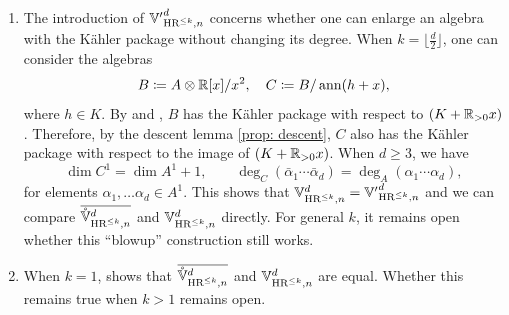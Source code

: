 \begin{remark}
\begin{enumerate}[leftmargin=*]
    \item The introduction of ${\Bbb V'}^d_{\text{HR}^{\leq k},n}$ concerns whether one can enlarge an algebra with the K\"ahler package without changing its degree. When $k=\lfloor\frac{d}{2}\rfloor$, one can consider the algebras
    \[
        B\coloneqq A\otimes \mathbb{R}[x]/x^2,\quad C\coloneqq B/\operatorname{ann}(h+x),
    \]
    where $h\in K$. By \cite[Proposition 7.7]{AHK18} and \cite{Cat08}, $B$ has the K\"ahler package with respect to $(K+\mathbb{R}_{>0}x)$. Therefore, by the descent lemma \cref{prop: descent}, $C$ also has the K\"ahler package with respect to the image of $(K+\mathbb{R}_{>0}x)$. When $d\geq 3$, we have
    \[
        \dim C^1=\dim A^1+1,\qquad \deg_C(\bar \alpha_1\cdots\bar \alpha_d)=\deg_A(\alpha_1\cdots\alpha_d),
    \]
    for elements $\alpha_1,\ldots\alpha_d\in A^1$. This shows that ${\Bbb V}^d_{\text{HR}^{\leq k},n}={\Bbb V'}^d_{\text{HR}^{\leq k},n}$ and we can compare $\overline{\mathring{\Bbb V}^d_{\text{HR}^{\leq k},n}}$ and ${\Bbb V}^d_{\text{HR}^{\leq k},n}$ directly. For general $k$, it remains open whether this ``blowup'' construction still works.
    \item When $k=1$,  shows that $\overline{\mathring{\Bbb V}^d_{\text{HR}^{\leq k},n}}$ and ${\Bbb V}^d_{\text{HR}^{\leq k},n}$ are equal. Whether this remains true when $k>1$ remains open.
\end{enumerate}
\end{remark}